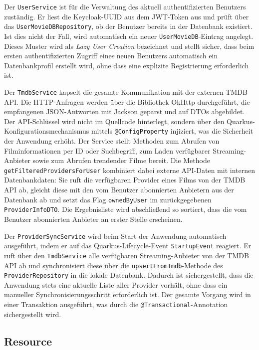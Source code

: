 Der \texttt{UserService} ist für die Verwaltung des aktuell authentifizierten
Benutzers zuständig. Er liest die Keycloak-UUID aus dem JWT-Token aus und
prüft über das \texttt{UserMovieDBRepository}, ob der Benutzer bereits in
der Datenbank existiert. Ist dies nicht der Fall, wird automatisch ein neuer
\texttt{UserMovieDB}-Eintrag angelegt. Dieses Muster wird als
\textit{Lazy User Creation} bezeichnet und stellt sicher, dass beim ersten
authentifizierten Zugriff eines neuen Benutzers automatisch ein
Datenbankprofil erstellt wird, ohne dass eine explizite Registrierung
erforderlich ist.

Der \texttt{TmdbService} kapselt die gesamte Kommunikation mit der externen
TMDB API. Die HTTP-Anfragen werden über die Bibliothek OkHttp durchgeführt,
die empfangenen JSON-Antworten mit Jackson geparst und auf DTOs abgebildet.
Der API-Schlüssel wird nicht im Quellcode hinterlegt, sondern über den
Quarkus-Konfigurationsmechanismus mittels \texttt{@ConfigProperty} injiziert,
was die Sicherheit der Anwendung erhöht. Der Service stellt Methoden zum
Abrufen von Filminformationen per ID oder Suchbegriff, zum Laden verfügbarer
Streaming-Anbieter sowie zum Abrufen trendender Filme bereit. Die Methode
\texttt{getFilteredProvidersForUser} kombiniert dabei externe API-Daten mit
internen Datenbankdaten: Sie ruft die verfügbaren Provider eines Films von
der TMDB API ab, gleicht diese mit den vom Benutzer abonnierten Anbietern
aus der Datenbank ab und setzt das Flag \texttt{ownedByUser} im
zurückgegebenen \texttt{ProviderInfoDTO}. Die Ergebnisliste wird abschließend
so sortiert, dass die vom Benutzer abonnierten Anbieter an erster Stelle
erscheinen.

Der \texttt{ProviderSyncService} wird beim Start der Anwendung automatisch
ausgeführt, indem er auf das Quarkus-Lifecycle-Event \texttt{StartupEvent}
reagiert. Er ruft über den \texttt{TmdbService} alle verfügbaren
Streaming-Anbieter von der TMDB API ab und synchronisiert diese über die
\texttt{upsertFromTmdb}-Methode des \texttt{ProviderRepository} in die
lokale Datenbank. Dadurch ist sichergestellt, dass die Anwendung stets eine
aktuelle Liste aller Provider vorhält, ohne dass ein manueller
Synchronisierungsschritt erforderlich ist. Der gesamte Vorgang wird in einer
Transaktion ausgeführt, was durch die \texttt{@Transactional}-Annotation
sichergestellt wird.

\subsection{Resource}


